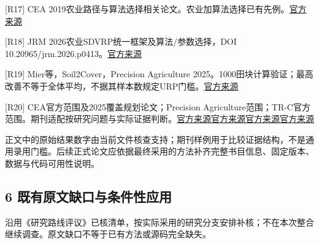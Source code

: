\documentclass[11pt,a4paper]{article}
\newcommand{\bodytext}[1]{#1\par}
\begin{document}
\bodytext{[R17] CEA 2019农业路径与算法选择相关论文。农业加算法选择已有先例。\newline \href{https://www.sciencedirect.com/science/article/abs/pii/S0168169918303867}{官方来源}}
\bodytext{[R18] JRM 2026农业SDVRP统一框架及算法/\allowbreak{}参数选择，DOI 10.20965/\allowbreak{}jrm.2026.p0413。\newline \href{https://www.jstage.jst.go.jp/article/jrobomech/38/2/38\_413/\_pdf}{官方来源}}
\bodytext{[R19] Mier等，Soil2Cover，Precision Agriculture 2025。1000田块计算验证；最高改善不等于全体平均，不据其样本数规定URP门槛。\newline \href{https://link.springer.com/article/10.1007/s11119-025-10250-4}{官方来源}}
\bodytext{[R20] CEA官方范围及2025覆盖规划论文；Precision Agriculture范围；TR-C官方范围。期刊适配按研究问题与实际证据判断。\newline \href{https://shop.elsevier.com/journals/computers-and-electronics-in-agriculture/0168-1699}{官方来源}\newline \href{https://www.sciencedirect.com/science/article/pii/S0168169925000523}{官方来源}\newline \href{https://link.springer.com/journal/11119/aims-and-scope}{官方来源}\newline \href{https://shop.elsevier.com/journals/transportation-research-part-c-emerging-technologies/0968-090X}{官方来源}}
\bodytext{正文中的原始结果数字由当前文件核查支持；期刊样例用于比较证据结构，不是通用录用门槛。后续正式论文应依据最终采用的方法补齐完整书目信息、固定版本、数据与代码可用性说明。}
\subsection{6  既有原文缺口与条件性应用}
\bodytext{沿用《研究路线评议》已核清单，按实际采用的研究分支安排补核；不在本次整合继续调查。原文缺口不等于已有方法或源码完全缺失。}
\begingroup
\fontsize{9.6}{14.6}\selectfont
\setlength{\tabcolsep}{4pt}
\renewcommand{\arraystretch}{1.18}
\end{document}
